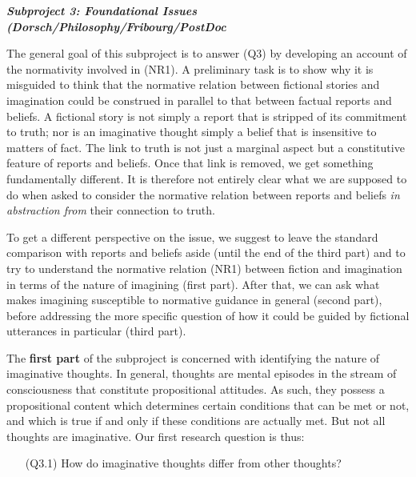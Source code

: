 \vspace{.4cm}
\noindent\textbf{\emph{Subproject 3: Foundational Issues (Dorsch/Philosophy/Fribourg/PostDoc}}
\vspace{.1cm}

\noindent The general goal of this subproject is to answer (Q3) by developing an account of the normativity involved in (NR1). A preliminary task is to show why it is misguided to think that the normative relation between fictional stories and imagination could be construed in parallel to that between factual reports and beliefs. A fictional story is not simply a report that is stripped of its commitment to truth; nor is an imaginative thought simply a belief that is insensitive to matters of fact. The link to truth is not just a marginal aspect but a constitutive feature of reports and beliefs. Once that link is removed, we get something fundamentally different. It is therefore not entirely clear what we are supposed to do when asked to consider the normative relation between reports and beliefs \emph{in abstraction from} their connection to truth.

To get a different perspective on the issue, we suggest to leave the standard comparison with reports and beliefs aside (until the end of the third part) and to try to understand the normative relation (NR1) between fiction and imagination in terms of the nature of imagining (first part). After that, we can ask what makes imagining susceptible to normative guidance in general (second part), before addressing the more specific question of how it could be guided by fictional utterances in particular (third part).

The \textbf{first part} of the subproject is concerned with identifying the nature of imaginative thoughts. In general, thoughts are mental episodes in the stream of consciousness that constitute propositional attitudes. As such, they possess a propositional content which determines certain conditions that can be met or not, and which is true if and only if these conditions are actually met. But not all thoughts are imaginative. Our first research question is thus:

\vspace{-.1cm}
\begin{itemize}[leftmargin=2cm]
\item[(Q3.1)] How do imaginative thoughts differ from other thoughts?
\end{itemize}
\vspace{-.1cm}

